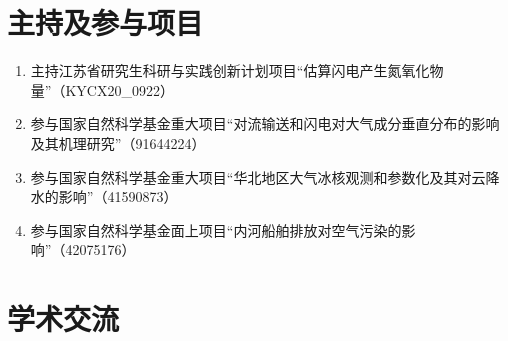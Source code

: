 \clearpage

\specialsectioning
\section{主持及参与项目}

\begin{enumerate}[label={（\arabic*）}, leftmargin=20pt, widest=0, itemindent=*, topsep=0pt, partopsep=0pt, parsep=0pt]

\item 主持江苏省研究生科研与实践创新计划项目“估算闪电产生氮氧化物量”（KYCX20\_0922） %

\item 参与国家自然科学基金重大项目“对流输送和闪电对大气成分垂直分布的影响及其机理研究”（91644224） %

\item 参与国家自然科学基金重大项目“华北地区大气冰核观测和参数化及其对云降水的影响”（41590873）%

\item 参与国家自然科学基金面上项目“内河船舶排放对空气污染的影响”（42075176） %

\end{enumerate}

\specialsectioning
\section{学术交流}

